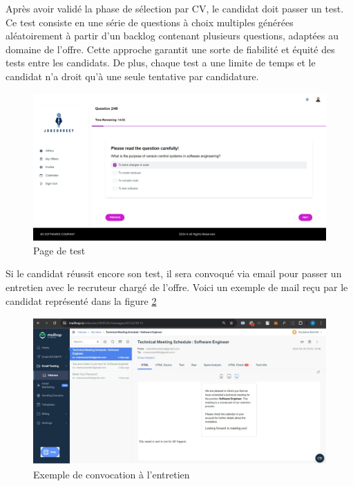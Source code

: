 Après avoir validé la phase de sélection par CV, le candidat doit passer un test. Ce test consiste 
en 
une série de questions à choix multiples générées aléatoirement à partir d'un backlog 
contenant plusieurs questions, adaptées au domaine de l'offre. Cette approche garantit 
une sorte de fiabilité et équité des tests entre les candidats. De plus, chaque test 
a une limite de temps et le candidat n'a droit qu'à une seule tentative par candidature.
\begin{figure}[htbp]
   \centering
   \includegraphics[scale=0.2]{screens/test.png} 
   \caption{Page de test}
   \label{fig:listOffers}
\end{figure}


Si le candidat réussit encore son test, il sera convoqué via email pour passer un entretien avec le recruteur 
chargé de l'offre. Voici un exemple de mail reçu par le candidat représenté dans la figure \ref{fig:mailEntretien}
\vspace{3cm}
\begin{figure}[htbp]
   \centering
   \includegraphics[scale=0.2]{Images/interviewMail.png} 
   \caption{Exemple de convocation à l'entretien}
   \label{fig:mailEntretien}
\end{figure}

